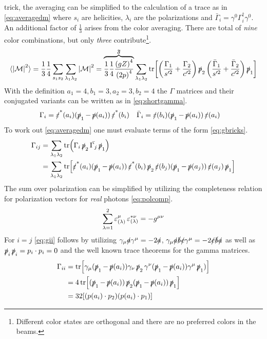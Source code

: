 trick, the averaging can be simplified to the calculation of a trace
as in \cref{eq:averagedm} where \(s_i\) are helicities, \(\lambda_i\)
are the polarizations and
\(\bar{\Gamma}_i=\gamma^0\Gamma^\dagger_i\gamma^0\). An additional
factor of \(\frac{1}{3}\) arises from the color averaging. There are
total of \emph{nine} color combinations, but only \emph{three}
contribute\footnote{Different color states are orthogonal and there
  are no preferred colors in the beams.}.
%
\begin{equation}
  \label{eq:averagedm}
  \langle\abs{\mathcal{M}}^2\rangle = \frac{1}{3}\frac{1}{4}\sum_{s_1 s_2}\sum_{\lambda_1
    \lambda_2} \abs{\mathcal{M}}^2=\overbrace{\frac{1}{3}\frac{1}{4}\frac{\qty(gZ)^4}{\qty(2p)^4}}^\mathfrak{F}\sum_{\lambda_1
    \lambda_2}\tr[\qty(\frac{\Gamma_1}{s'^2}+\frac{\Gamma_2}{c'^2})
  \ps_2\qty(\frac{\bar{\Gamma}_1}{s'^2}+\frac{\bar{\Gamma}_2}{c'^2})\ps_1]
\end{equation}
%
With the definition \(a_1=4,b_1=3,a_2=3,b_2=4\) the \(\Gamma\)
matrices and their conjugated variants can be written as in
\cref{eq:shortgamma}.
%
\begin{align}
  \label{eq:shortgamma}
  \Gamma_i &= \pses(a_i)(\ps_1 - \ps(a_i))\pses(b_i) & \bar{\Gamma}_i &= \pes(b_i)(\ps_1 - \ps(a_i))\pes(a_i)
\end{align}
%
To work out \cref{eq:averagedm} one must evaluate terms of the
form \cref{eq:gbricks}.
%
\begin{equation}
  \label{eq:gbricks}
  \begin{split}
    \Gamma_{ij} &= \sum_{\lambda_1\lambda_2}
    \tr(\Gamma_i\ps_2\bar{\Gamma_j}\ps_1)\\
    &= \sum_{\lambda_1\lambda_2}
    \tr[\pses(a_i)(\ps_1-\ps(a_i))\pses(b_i)\ps_2\pes(b_j)(\ps_1 -
    \ps(a_j))\pes(a_j)\ps_1]
  \end{split}
\end{equation}
%
The sum over polarization can be simplified by utilizing the
completeness relation for polarization vectors for \emph{real} photons
\cref{eq:polcomp}.
%
\begin{equation}
  \label{eq:polcomp}
  \sum_{\lambda=1}^{2}\pe_{(\lambda)}^\mu\pe_{(\lambda)}^{*\nu} = -g^{\mu\nu}
\end{equation}
%
For \(i=j\) \cref{eq:gii} follows by utilizing
\(\gamma_\mu\sl{a}\gamma^\mu=-2\sl{a}\),
\(\gamma_\mu\sl{a}\sl{b}\sl{c}\gamma^\mu=-2\sl{c}\sl{b}\sl{a}\) as
well as \(\ps_i\ps_i=p_i\cdot p_i = 0\) and the well known trace
theorems for the gamma matrices.
\begin{equation}
  \label{eq:gii}
  \begin{split}
\Gamma_{ii} &=
\tr[\gamma_\mu(\ps_1-\ps(a_i))\gamma_\nu\ps_2\gamma^\nu(\ps_1-\ps(a_i))\gamma^\mu\ps_1)]
\\
&= 4\tr[(\ps_1-\ps(a_i))\ps_2(\ps_1-\ps(a_i))\ps_1]\\
&= 32\qty[(p(a_i)\cdot p_2)(p(a_i)\cdot p_1)]
\end{split}
\end{equation}
